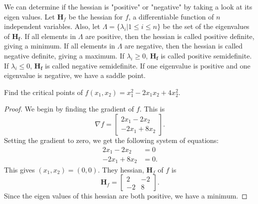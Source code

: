 \documentclass[12pt]{scrartcl}
\begin{document}
We can determine if the hessian is "positive" or "negative" by taking a look
at its eigen values. Let $\mathbf{H}_f$ be the hessian for $f$, a differentiable
function of $n$ independent variables. Also, let $\Lambda = \{\lambda_i | 1 \leq i \leq n\}$
be the set of the eigenvalues of $\mathbf{H_f}$. If all elements in $\Lambda$ are positive,
then the hessian is called \alert{positive definite}, giving a minimum. If all 
elements in $\Lambda$ are negative, then the hessian is called \alert{negative definite},
giving a maximum. If $\lambda_i \geq 0$, $\mathbf{H_f}$ is called \alert{positive semidefinite}.
If $\lambda_i \leq 0$, $\mathbf{H_f}$ is called \alert{negative semidefinite}. If
one eigenvalue is positive and one eigenvalue is negative, we have a \alert{saddle point}.\
\begin{example}
    Find the critical points of $f(x_1, x_2) = x_1^2-2x_1x_2+4x_2^2$.
\end{example}
\begin{proof}
    We begin by finding the gradient of $f$. This is $$\nabla f =
    \begin{bmatrix} 2x_1-2x_2 \\ -2x_1 + 8x_2 \end{bmatrix}.$$
    Setting the gradient to zero, we get the following system of equations:
    \begin{align*}
        2x_1-2x_2 &= 0 \\
        -2x_1+8x_2 &= 0.
    \end{align*}
    This gives $(x_1, x_2) = (0,0)$. They hessian, $\mathbf{H}_f$ of $f$ is
    $$\mathbf{H}_f = \begin{bmatrix} 2 & -2 \\ -2 & 8\end{bmatrix}.$$ Since
    the eigen values of this hessian are both positive, we have a minimum.
\end{proof}
\end{document}
